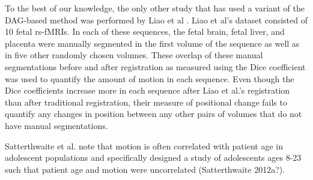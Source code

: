 To the best of our knowledge, the only other study that has used a variant of the DAG-based method was performed by Liao et al \cite{Liao2016}. Liao et al’s dataset consisted of 10 fetal rs-fMRIs. In each of these sequences, the fetal brain, fetal liver, and placenta were manually segmented in the first volume of the sequence as well as in five other randomly chosen volumes. These overlap of these manual segmentations before and after registration as measured using the Dice coefficient was used to quantify the amount of motion in each sequence. Even though the Dice coefficients increase more in each sequence after Liao et al.’s registration than after traditional registration, their measure of positional change fails to quantify any changes in position between any other pairs of volumes that do not have manual segmentations. 

Satterthwaite et al. note that motion is often correlated with patient age in adolescent populations and specifically designed a study of adolescents ages 8-23 such that patient age and motion were uncorrelated (Satterthwaite 2012a?).
